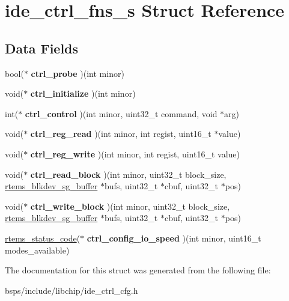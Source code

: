 \hypertarget{structide__ctrl__fns__s}{}\section{ide\+\_\+ctrl\+\_\+fns\+\_\+s Struct Reference}
\label{structide__ctrl__fns__s}
\subsection*{Data Fields}
\begin{DoxyCompactItemize}
\item 
\mbox{\label{structide__ctrl__fns__s_a3d05304b3fd165ccb0c5a2a95915cc3e}} 
bool($\ast$ {\bfseries ctrl\+\_\+probe} )(int minor)
\item 
\mbox{\label{structide__ctrl__fns__s_ab6da2bff7b256b7fd63f83d15281401c}} 
void($\ast$ {\bfseries ctrl\+\_\+initialize} )(int minor)
\item 
\mbox{\label{structide__ctrl__fns__s_a44b9f44db6c8ba16fd51ed20202327c2}} 
int($\ast$ {\bfseries ctrl\+\_\+control} )(int minor, uint32\+\_\+t command, void $\ast$arg)
\item 
\mbox{\label{structide__ctrl__fns__s_af5c68ca1438a06900b9cf61c9c50e28b}} 
void($\ast$ {\bfseries ctrl\+\_\+reg\+\_\+read} )(int minor, int regist, uint16\+\_\+t $\ast$value)
\item 
\mbox{\label{structide__ctrl__fns__s_a2a921e2cc7ca8f464a6522bc8a338131}} 
void($\ast$ {\bfseries ctrl\+\_\+reg\+\_\+write} )(int minor, int regist, uint16\+\_\+t value)
\item 
\mbox{\label{structide__ctrl__fns__s_ae6195dec38e9ed3bedac6cf5dd54ada6}} 
void($\ast$ {\bfseries ctrl\+\_\+read\+\_\+block} )(int minor, uint32\+\_\+t block\+\_\+size, \mbox{\hyperlink{structrtems__blkdev__sg__buffer}{rtems\+\_\+blkdev\+\_\+sg\+\_\+buffer}} $\ast$bufs, uint32\+\_\+t $\ast$cbuf, uint32\+\_\+t $\ast$pos)
\item 
\mbox{\label{structide__ctrl__fns__s_ab2fb9103417fed71ebe2364a0cfad348}} 
void($\ast$ {\bfseries ctrl\+\_\+write\+\_\+block} )(int minor, uint32\+\_\+t block\+\_\+size, \mbox{\hyperlink{structrtems__blkdev__sg__buffer}{rtems\+\_\+blkdev\+\_\+sg\+\_\+buffer}} $\ast$bufs, uint32\+\_\+t $\ast$cbuf, uint32\+\_\+t $\ast$pos)
\item 
\mbox{\label{structide__ctrl__fns__s_a2c042f6652bbbc38316a0106299ab6cb}} 
\mbox{\hyperlink{group__ClassicStatus_ga545d41846817eaba6143d52ee4d9e9fe}{rtems\+\_\+status\+\_\+code}}($\ast$ {\bfseries ctrl\+\_\+config\+\_\+io\+\_\+speed} )(int minor, uint16\+\_\+t modes\+\_\+available)
\end{DoxyCompactItemize}


The documentation for this struct was generated from the following file\+:\begin{DoxyCompactItemize}
\item 
bsps/include/libchip/ide\+\_\+ctrl\+\_\+cfg.\+h\end{DoxyCompactItemize}
